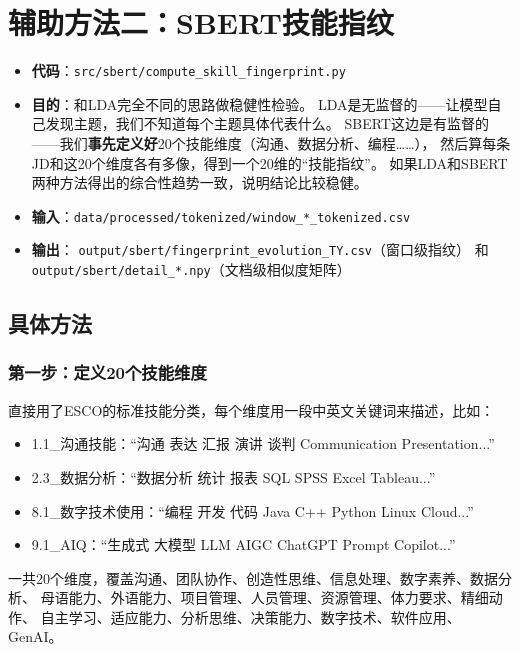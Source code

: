 \documentclass[12pt,a4paper]{ctexart}
\begin{document}
\section{辅助方法二：SBERT技能指纹}
\label{sec:sbert}

\begin{itemize}[leftmargin=2em]
\item \textbf{代码}：\texttt{src/sbert/compute\_skill\_fingerprint.py}
\item \textbf{目的}：和LDA完全不同的思路做稳健性检验。
LDA是无监督的——让模型自己发现主题，我们不知道每个主题具体代表什么。
SBERT这边是有监督的——我们\textbf{事先定义好}20个技能维度（沟通、数据分析、编程……），
然后算每条JD和这20个维度各有多像，得到一个20维的``技能指纹''。
如果LDA和SBERT两种方法得出的综合性趋势一致，说明结论比较稳健。
\item \textbf{输入}：\texttt{data/processed/tokenized/window\_*\_tokenized.csv}
\item \textbf{输出}：
\texttt{output/sbert/fingerprint\_evolution\_TY.csv}（窗口级指纹）
和 \texttt{output/sbert/detail\_*.npy}（文档级相似度矩阵）
\end{itemize}

\subsection{具体方法}

\subsubsection{第一步：定义20个技能维度}

直接用了ESCO的标准技能分类，每个维度用一段中英文关键词来描述，比如：
\begin{itemize}
\item 1.1\_沟通技能：``沟通 表达 汇报 演讲 谈判 Communication Presentation...''
\item 2.3\_数据分析：``数据分析 统计 报表 SQL SPSS Excel Tableau...''
\item 8.1\_数字技术使用：``编程 开发 代码 Java C++ Python Linux Cloud...''
\item 9.1\_AIQ：``生成式 大模型 LLM AIGC ChatGPT Prompt Copilot...''
\end{itemize}
一共20个维度，覆盖沟通、团队协作、创造性思维、信息处理、数字素养、数据分析、
母语能力、外语能力、项目管理、人员管理、资源管理、体力要求、精细动作、
自主学习、适应能力、分析思维、决策能力、数字技术、软件应用、GenAI。
\end{document}
